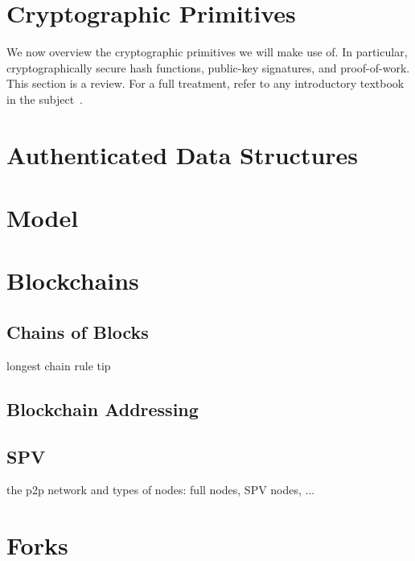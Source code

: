 \section{Cryptographic Primitives}

We now overview the cryptographic primitives we will make use of. In particular,
cryptographically secure hash functions, public-key signatures, and
proof-of-work. This section is a review. For a full
treatment, refer to any introductory textbook in the subject~\cite{katz,handbook,foundations1,foundations2}.




\section{Authenticated Data Structures}


\section{Model}






\section{Blockchains}




\ifdraft
\subsection{Chains of Blocks}
longest chain rule
tip

\subsection{Blockchain Addressing}
\subsection{SPV}
the p2p network and types of nodes: full nodes, SPV nodes, ...

\section{Forks}
